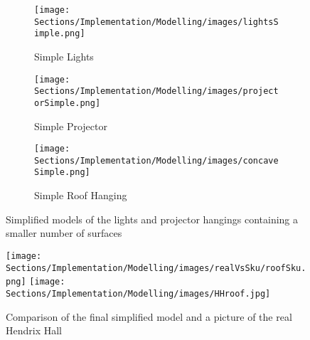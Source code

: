 \documentclass[../../main.tex]{subfiles}
\begin{document}

			\begin{figure}[ht]
				\begin{subfigure}[t]{4in}
					\centering
					\texttt{[image: Sections/Implementation/Modelling/images/lightsSimple.png]}
					\caption{Simple Lights}
				\end{subfigure}
				\begin{subfigure}[t]{3in}
					\centering
					\texttt{[image: Sections/Implementation/Modelling/images/projectorSimple.png]}
					\caption{Simple Projector}
				\end{subfigure}
				\begin{subfigure}[t]{3in}
					\centering
					\texttt{[image: Sections/Implementation/Modelling/images/concaveSimple.png]}
					\caption{Simple Roof Hanging}
				\end{subfigure}
				\caption{Simplified models of the lights and projector hangings containing a smaller number of surfaces}
				\label{simpleSurfaces}
			\end{figure}

		\begin{figure}[ht]
				\center\texttt{[image: Sections/Implementation/Modelling/images/realVsSku/roofSku.png]}
				\center\texttt{[image: Sections/Implementation/Modelling/images/HHroof.jpg]}
				\caption{Comparison of the final simplified model and a picture of the real Hendrix Hall}
				\label{simpleSurfacesRoom}
			\end{figure}
\end{document}
